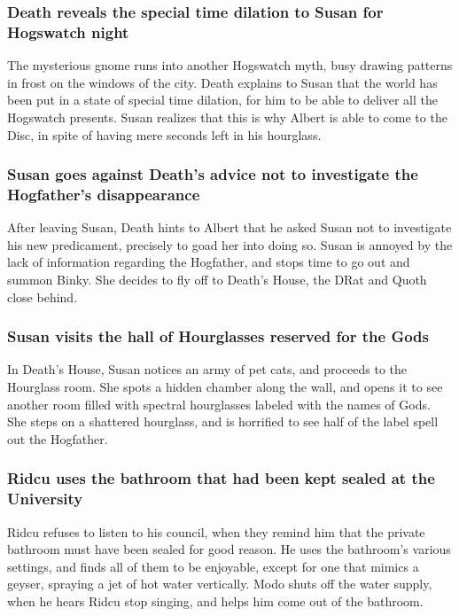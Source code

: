 \subsubsection{\Gls{Death} reveals the special time dilation to \Gls{Susan} for Hogswatch night}
The mysterious gnome runs into another Hogswatch myth, busy drawing patterns in frost on the
windows of the city. \Gls{Death} explains to \Gls{Susan} that the world has been put in a state of
special time dilation, for him to be able to deliver all the Hogswatch presents. \Gls{Susan}
realizes that this is why \Gls{Albert} is able to come to the Disc, in spite of having mere seconds
left in his hourglass.

\subsubsection{\Gls{Susan} goes against \Gls{Death}'s advice not to investigate the Hogfather's
    disappearance}
After leaving \Gls{Susan}, \Gls{Death} hints to \Gls{Albert} that he asked \Gls{Susan} not to
investigate his new predicament, precisely to goad her into doing so. \Gls{Susan} is annoyed by the
lack of information regarding the Hogfather, and stops time to go out and summon \Gls{Binky}. She
decides to fly off to \Gls{Death}'s House, the \Gls{DRat} and \Gls{Quoth} close behind.

\subsubsection{\Gls{Susan} visits the hall of Hourglasses reserved for the Gods}
In \Gls{Death}'s House, \Gls{Susan} notices an army of pet cats, and proceeds to the Hourglass room.
She spots a hidden chamber along the wall, and opens it to see another room filled with spectral
hourglasses labeled with the names of Gods. She steps on a shattered hourglass, and is horrified to
see half of the label spell out the Hogfather.

\subsubsection{\Gls{Ridcu} uses the bathroom that had been kept sealed at the University}
\Gls{Ridcu} refuses to listen to his council, when they remind him that the private bathroom must
have been sealed for good reason. He uses the bathroom's various settings, and finds all of them to
be enjoyable, except for one that mimics a geyser, spraying a jet of hot water vertically.
\Gls{Modo} shuts off the water supply, when he hears \Gls{Ridcu} stop singing, and helps him come
out of the bathroom.

